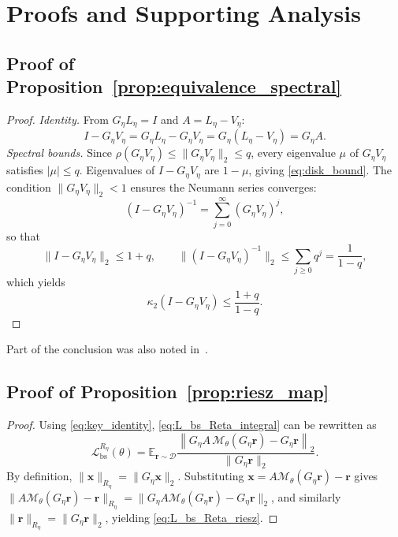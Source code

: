 \documentclass{article}
\providecommand{\E}{\mathbb{E}}
\theoremstyle{plain}
\theoremstyle{remark}
\begin{document}




\appendix

\section{Proofs and Supporting Analysis}
\label{app:proofs}

\subsection{Proof of Proposition~\ref{prop:equivalence_spectral}}
\label{app:proof_equivalence_spectral}

\begin{proof}

\emph{Identity.}\; From $G_\eta L_\eta=I$ and $A=L_\eta-V_\eta$:
\[
I-G_\eta V_\eta
=
G_\eta L_\eta - G_\eta V_\eta
=
G_\eta(L_\eta - V_\eta)
=
G_\eta A.
\]
\emph{Spectral bounds.}\; Since $\rho(G_\eta V_\eta)\le\|G_\eta V_\eta\|_2\le q$, every eigenvalue $\mu$ of $G_\eta V_\eta$ satisfies $|\mu|\le q$. Eigenvalues of $I-G_\eta V_\eta$ are $1-\mu$, giving \eqref{eq:disk_bound}. The condition $\|G_\eta V_\eta\|_2<1$ ensures the Neumann series converges:
\begin{equation}
(I-G_\eta V_\eta)^{-1}=\sum_{j=0}^{\infty}(G_\eta V_\eta)^j,
\label{eq:neumann_bound}
\end{equation}
so that
\[
\|I-G_\eta V_\eta\|_2\le 1+q,\qquad
\|(I-G_\eta V_\eta)^{-1}\|_2\le \sum_{j\ge 0}q^j=\frac{1}{1-q},
\]
which yields
\begin{equation}
\kappa_2(I-G_\eta V_\eta)\le \frac{1+q}{1-q}.
\end{equation}
\end{proof}
Part of the conclusion was also noted in~\cite{huang2021finite}.
\subsection{Proof of Proposition~\ref{prop:riesz_map}}
\label{app:proof_riesz_map}

\begin{proof}
Using \eqref{eq:key_identity}, \eqref{eq:L_bs_Reta_integral} can be rewritten as
\begin{equation}
\mathcal{L}_{\mathrm{bs}}^{R_\eta}(\theta)
=
\E_{\bm r\sim\mathcal{D}}
\frac{
\left\|
G_\eta A\,\mathcal{M}_\theta(G_\eta \bm r)-G_\eta \bm r
\right\|_2
}{
\|G_\eta \bm r\|_2
}.
\label{eq:L_bs_Reta_GA}
\end{equation}
By definition, $\|\bm x\|_{R_\eta}=\|G_\eta \bm x\|_2$. Substituting
$\bm x = A\mathcal{M}_\theta(G_\eta \bm r)-\bm r$ gives
$\|A\mathcal{M}_\theta(G_\eta \bm r)-\bm r\|_{R_\eta}
=
\|G_\eta A\mathcal{M}_\theta(G_\eta \bm r)-G_\eta \bm r\|_2$,
and similarly $\|\bm r\|_{R_\eta}=\|G_\eta \bm r\|_2$, yielding \eqref{eq:L_bs_Reta_riesz}.
\end{proof}
\end{document}
